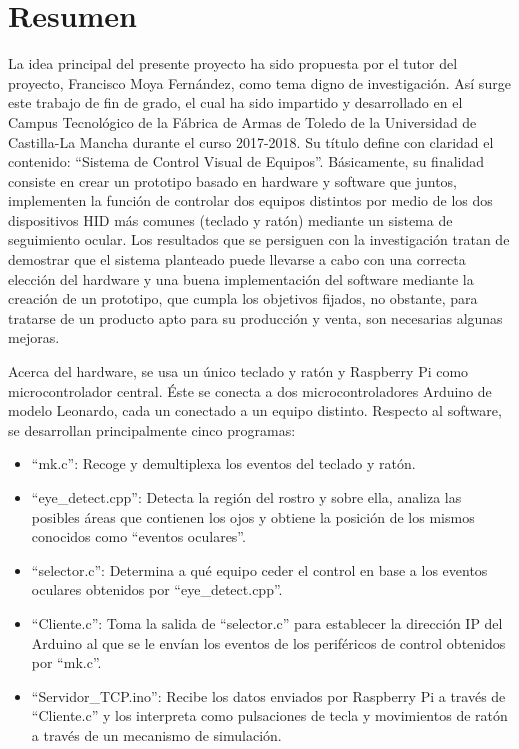 %
\chapter*{Resumen} \label{resumen}
\pagestyle{empty}
\thispagestyle{empty} 

La idea principal del presente proyecto ha sido propuesta por el tutor del proyecto, Francisco Moya Fernández, como tema digno de investigación. Así surge este trabajo de fin de grado, el cual ha sido impartido y desarrollado en el Campus Tecnológico de la Fábrica de Armas de Toledo de la Universidad de Castilla-La Mancha durante el curso 2017-2018. Su título define con claridad el contenido: ``Sistema de Control Visual de Equipos''. Básicamente, su finalidad consiste en crear un prototipo basado en hardware y software que juntos, implementen la función de controlar dos equipos distintos por medio de los dos dispositivos HID más comunes (teclado y ratón) mediante un sistema de seguimiento ocular. Los resultados que se persiguen con la investigación tratan de demostrar que el sistema planteado puede llevarse a cabo con una correcta elección del hardware y una buena implementación del software mediante la creación de un prototipo, que cumpla los objetivos fijados, no obstante, para tratarse de un producto apto para su producción y venta, son necesarias algunas mejoras.

Acerca del hardware, se usa un único teclado y ratón y Raspberry Pi como microcontrolador central. Éste se conecta a dos microcontroladores Arduino de modelo Leonardo, cada un conectado a un equipo distinto. Respecto al software, se desarrollan principalmente cinco programas:
\begin{itemize}
    \item ``mk.c'': Recoge y demultiplexa los eventos del teclado y ratón.
    \item ``eye\_detect.cpp'': Detecta la región del rostro y sobre ella, analiza las posibles áreas que contienen los ojos y obtiene la posición de los mismos conocidos como ``eventos oculares''.
    \item ``selector.c'': Determina a qué equipo ceder el control en base a los eventos oculares obtenidos por ``eye\_detect.cpp''.
    \item ``Cliente.c'': Toma la salida de ``selector.c'' para establecer la dirección IP del Arduino al que se le envían los eventos de los periféricos de control obtenidos por ``mk.c''.
    \item ``Servidor\_TCP.ino'': Recibe los datos enviados por Raspberry Pi a través de ``Cliente.c'' y los interpreta como pulsaciones de tecla y movimientos de ratón a través de un mecanismo de simulación.
\end{itemize}


